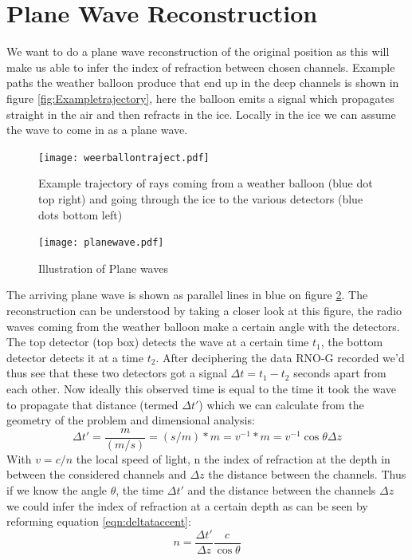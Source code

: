 \section{Plane Wave Reconstruction}
We want to do a plane wave reconstruction of the original position
as this will make us able to infer the index of refraction between chosen
channels. Example paths the weather balloon produce that end up in the deep 
channels is shown in figure
\ref{fig:Exampletrajectory}, here the balloon emits a signal which propagates
straight in the air and then refracts in the ice. Locally in the ice we can assume
the wave to come in as a plane wave.
\begin{figure}
	\centering
	\texttt{[image: weerballontraject.pdf]}
	\caption{Example trajectory of rays coming from a weather balloon (blue dot top right) and going through the ice to the various detectors (blue dots bottom left)}
	\label{fig:Example trajectory}
\end{figure}
\begin{figure}
	\centering
	\texttt{[image: planewave.pdf]}
	\caption{Illustration of Plane waves}	
	\label{fig:Plane Wave}
\end{figure}
The arriving plane wave is shown as parallel lines in blue on figure \ref{fig:Plane Wave}. The
reconstruction can be understood by taking a closer look at this figure, 
the radio waves coming from the weather balloon make a certain angle with the detectors. The top detector (top box)
detects the wave at a certain time $t_1$, the bottom detector detects it at a
time $t_2$. After deciphering the data RNO-G recorded we'd thus see that these
two detectors got a signal $\Delta t = t_1 - t_2$ seconds apart from each other.
Now ideally this observed time is equal to the time it took the
wave to propagate that distance (termed $\Delta t'$) which we can calculate from the geometry of
the problem and dimensional analysis:
\begin{equation}
	\Delta t' = \frac{m}{(m/s)} = (s/m)*m = v^{-1} * m = v^{-1} \cos\theta \Delta z
	\label{eqn:deltataccent}
\end{equation}
With $v = c/n$ the local speed of light, n the index of refraction at the depth in between
the considered channels and $\Delta z$ the distance between the channels. 
Thus if we know the angle $\theta$, the time $\Delta t'$ and the distance between the channels $\Delta z$
we could infer the index of refraction at a certain depth as can be seen by reforming equation \ref{eqn:deltataccent}:
\begin{equation}
	n = \frac{\Delta t'}{\Delta z} \frac{c}{\cos\theta}
\end{equation}
